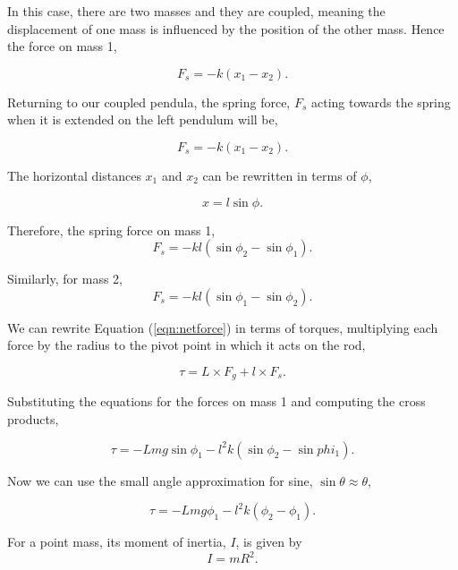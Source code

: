 \documentclass{article}
\begin{document}
In this case, there are two masses and they are coupled, 
meaning the displacement of one mass is influenced by the
position of the other mass. Hence the force on mass 1,

\begin{equation}
    F_s = -k(x_1 - x_2).
\end{equation}

Returning to our coupled pendula, the spring force, $F_s$
acting towards the spring when it is extended on the left
pendulum will be,

\begin{equation}
    F_s = -k(x_1 - x_2).
\end{equation}

The horizontal distances $x_1$ and $x_2$ can be rewritten in
terms of $\phi$,

\begin{equation}
    x = l\sin{\phi}.
\end{equation}

Therefore, the spring force on mass 1,
\begin{equation}
    F_s = -kl(\sin{\phi_2}-\sin{\phi_1}).
\end{equation}

Similarly, for mass 2,
\begin{equation}
    F_s = -kl(\sin{\phi_1}-\sin{\phi_2}).
\end{equation}

We can rewrite Equation (\ref{eqn:netforce}) in terms of torques,
multiplying each force by the radius to the pivot point in which 
it acts on the rod,

\begin{equation}
    \tau = L\times F_g + l \times F_s.
\end{equation}

Substituting the equations for the forces on mass 1 and computing 
the cross products,

\begin{equation}
    \tau = -Lmg\sin{\phi_1} - l^2k(\sin{\phi_2}-\sin{phi_1}).
\end{equation}

Now we can use the small angle approximation for sine, $\sin{\theta}
\approx \theta$,

\begin{equation}
    \tau = -Lmg\phi_1 - l^2k(\phi_2 - \phi_1).
\end{equation}

For a point mass, its moment of inertia, $I$, is given by
\begin{equation}
    I = mR^2.
\end{equation}
\end{document}
